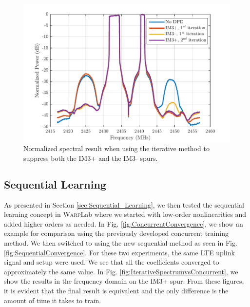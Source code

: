 \begin{figure}[t!] 
\centering
\includegraphics[width=0.9\columnwidth]{Figures/RightThenLeft_NEW}
\caption{Normalized spectral result when using the iterative method to suppress both the IM3+ and the IM3- spurs.}
\label{fig:RightThenLeft}
\end{figure}

\subsection{Sequential Learning}
As presented in Section \ref{sec:Sequential_Learning}, we then tested the sequential learning concept in \textsc{Warp}Lab where we started with low-order nonlinearities and added higher orders as needed. In Fig. \ref{fig:ConcurrentConvergence}, we show an example for comparison using the previously developed concurrent training method. We then switched to using the new sequential method as seen in Fig. \ref{fig:SequentialConvergence}. For these two experiments, the same LTE uplink signal and setup were used. We see that all the coefficients converged to approximately the same value. In Fig. \ref{fig:IterativeSpectrumvsConcurrent}, we show the results in the frequency domain on the IM3+ spur. From these figures, it is evident that the final result is equivalent and the only difference is the amount of time it takes to train.

